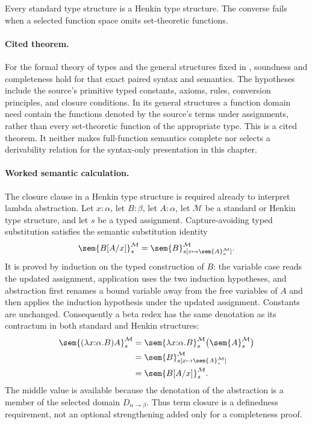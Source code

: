Every standard type structure is a Henkin type structure.  The converse fails
when a selected function space omits set-theoretic functions.

\paragraph{Cited theorem.}
For the formal theory of types and the general structures fixed in
\cite[pp.~81--91]{Henkin1950}, soundness and completeness hold for that exact
paired syntax and semantics.  The hypotheses include the source's primitive
typed constants, axioms, rules, conversion principles, and closure conditions.
In its general structures a function domain need contain the functions denoted
by the source's terms under assignments, rather than every set-theoretic
function of the appropriate type.  This is a cited theorem.  It neither makes
full-function semantics complete nor selects a derivability relation for the
syntax-only presentation in this chapter.

\paragraph{Worked semantic calculation.}
The closure clause in a Henkin type structure is required already to interpret
lambda abstraction.  Let \(x{:}\alpha\), let \(B{:}\beta\), let
\(A{:}\alpha\), let \(\mathcal M\) be a standard or Henkin type structure,
and let \(s\) be a typed assignment.  Capture-avoiding typed substitution
satisfies the semantic substitution identity
\[
  \sem{B[A/x]}^{\mathcal M}_s
  =
  \sem{B}^{\mathcal M}_{
    s[x\mapsto\sem{A}^{\mathcal M}_s]}.
\]
It is proved by induction on the typed construction of \(B\): the variable
case reads the updated assignment, application uses the two induction
hypotheses, and abstraction first renames a bound variable away from the free
variables of \(A\) and then applies the induction hypothesis under the updated
assignment.  Constants are unchanged.  Consequently a beta redex has the same
denotation as its contractum in both standard and Henkin structures:
\[
\begin{aligned}
  \sem{(\lambda x{:}\alpha.B)A}^{\mathcal M}_s
    &=\sem{\lambda x{:}\alpha.B}^{\mathcal M}_s
       \bigl(\sem{A}^{\mathcal M}_s\bigr)\\
    &=\sem{B}^{\mathcal M}_{
       s[x\mapsto\sem{A}^{\mathcal M}_s]}\\
    &=\sem{B[A/x]}^{\mathcal M}_s.
\end{aligned}
\]
The middle value is available because the denotation of the abstraction is a
member of the selected domain \(D_{\alpha\to\beta}\).  Thus term closure is a
definedness requirement, not an optional strengthening added only for a
completeness proof.

